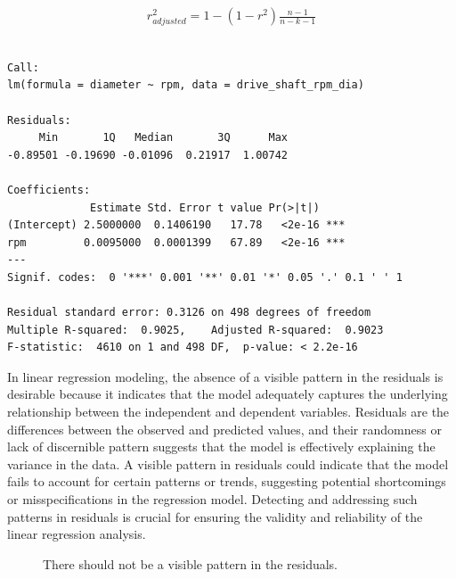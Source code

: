\documentclass[
  a4paper,
]{scrbook}
\begin{document}
\begin{align}
r^2_{adjusted} = 1 - (1-r^2)\frac{n-1}{n-k-1} \label{r2adj}
\end{align}

\begin{verbatim}

Call:
lm(formula = diameter ~ rpm, data = drive_shaft_rpm_dia)

Residuals:
     Min       1Q   Median       3Q      Max 
-0.89501 -0.19690 -0.01096  0.21917  1.00742 

Coefficients:
             Estimate Std. Error t value Pr(>|t|)    
(Intercept) 2.5000000  0.1406190   17.78   <2e-16 ***
rpm         0.0095000  0.0001399   67.89   <2e-16 ***
---
Signif. codes:  0 '***' 0.001 '**' 0.01 '*' 0.05 '.' 0.1 ' ' 1

Residual standard error: 0.3126 on 498 degrees of freedom
Multiple R-squared:  0.9025,    Adjusted R-squared:  0.9023 
F-statistic:  4610 on 1 and 498 DF,  p-value: < 2.2e-16
\end{verbatim}

In linear regression modeling, the absence of a visible pattern in the
residuals is desirable because it indicates that the model adequately
captures the underlying relationship between the independent and
dependent variables. Residuals are the differences between the observed
and predicted values, and their randomness or lack of discernible
pattern suggests that the model is effectively explaining the variance
in the data. A visible pattern in residuals could indicate that the
model fails to account for certain patterns or trends, suggesting
potential shortcomings or misspecifications in the regression model.
Detecting and addressing such patterns in residuals is crucial for
ensuring the validity and reliability of the linear regression analysis.

\begin{figure}[H]


\caption{\label{fig-lm-resid-pattern}There should not be a visible
pattern in the residuals.}

\end{figure}%
\end{document}
